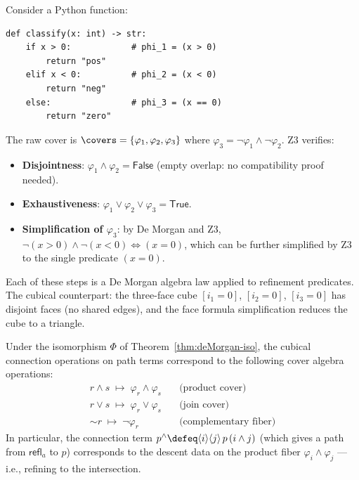 \begin{example}
Consider a Python function:
\begin{verbatim}
def classify(x: int) -> str:
    if x > 0:            # phi_1 = (x > 0)
        return "pos"
    elif x < 0:          # phi_2 = (x < 0)
        return "neg"
    else:                # phi_3 = (x == 0)
        return "zero"
\end{verbatim}
The raw cover is $\covers = \{\varphi_1, \varphi_2, \varphi_3\}$ where
$\varphi_3 = \neg\varphi_1 \wedge \neg\varphi_2$.  Z3 verifies:
\begin{itemize}
\item \textbf{Disjointness}: $\varphi_1 \wedge \varphi_2 = \mathsf{False}$
  (empty overlap: no compatibility proof needed).
\item \textbf{Exhaustiveness}: $\varphi_1 \vee \varphi_2 \vee \varphi_3
  = \mathsf{True}$.
\item \textbf{Simplification of $\varphi_3$}: by De Morgan and Z3,
  $\neg(x > 0) \wedge \neg(x < 0) \Leftrightarrow (x = 0)$,
  which can be further simplified by Z3 to the single predicate $(x = 0)$.
\end{itemize}
Each of these steps is a De Morgan algebra law applied to refinement
predicates.  The cubical counterpart: the three-face cube $[i_1 = 0]$,
$[i_2 = 0]$, $[i_3 = 0]$ has disjoint faces (no shared edges), and the
face formula simplification reduces the cube to a triangle.
\end{example}

\begin{proposition}
\label{prop:connections-as-cover-ops}
Under the isomorphism $\Phi$ of Theorem~\ref{thm:deMorgan-iso}, the
cubical connection operations on path terms correspond to the following
cover algebra operations:
\begin{align*}
  r \wedge s \;\longmapsto\; \varphi_r \wedge \varphi_s
    & \quad \text{(product cover)} \\
  r \vee s \;\longmapsto\; \varphi_r \vee \varphi_s
    & \quad \text{(join cover)} \\
  \sim r \;\longmapsto\; \neg \varphi_r
    & \quad \text{(complementary fiber)}
\end{align*}
In particular, the connection term $p^\wedge \defeq \langle i\rangle
\langle j \rangle\, p\,(i \wedge j)$ (which gives a path from
$\mathsf{refl}_a$ to $p$) corresponds to the descent data on the product
fiber $\varphi_i \wedge \varphi_j$ --- i.e., refining to the intersection.
\end{proposition}

